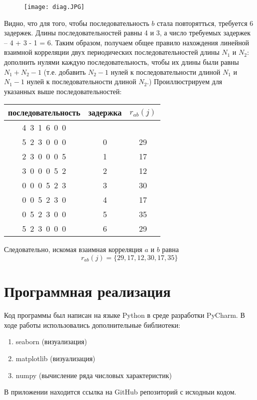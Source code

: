 \documentclass{article}
\begin{document}
\begin{figure}[H]
		\centering
		\texttt{[image: diag.JPG]}
		\label{fig:diag}
	\end{figure}
\noindent Видно, что для того, чтобы последовательность $b$ стала повторятться, требуется 6 задержек. Длины последовательностей равны 4 и 3, а число требуемых задержек -- 4 + 3 - 1 = 6. Таким образом, получаем общее правило нахождения линейной взаимной корреляции двух периодических последовательностей длины $N_1$ и $N_2$: дополнить нулями каждую последовательность, чтобы их длины были равны $N_1+N_2-1$ (т.е. добавить $N_2-1$ нулей к последовательности длиной $N_1$ и $N_1-1$ нулей к последовательности длиной $N_2$.) Проиллюстрируем для указанных выше последовательностей:

\begin{table}[H]
    \centering
    \begin{tabular}{|c|c|c|}
    \hline 
         последовательность & задержка & $r_{ab}(j)$  \\
         \hline \hline
         4~3~1~6~0~0 & & \\
         \hline
         5~2~3~0~0~0 & 0 & 29\\ \hline
         2~3~0~0~0~5 & 1 & 17\\ \hline
         3~0~0~0~5~2 & 2 & 12\\ \hline
         0~0~0~5~2~3 & 3 & 30\\ \hline
         0~0~5~2~3~0 & 4 & 17\\ \hline
         0~5~2~3~0~0 & 5 & 35\\ \hline
         5~2~3~0~0~0 & 6 & 29\\
     \hline    
    \end{tabular}
    \label{tab:my_label}
\end{table}
\noindent Следовательно, искомая взаимная корреляция $a$ и $b$ равна
$$r_{ab}(j)=\{29,17,12,30,17,35\}$$

\section{Программная реализация}
\noindent Код программы был написан на языке Python в среде разработки PyCharm. В ходе работы использовались дополнительные библиотеки:
 \begin{enumerate}
        \item seaborn (визуализация)
        \item matplotlib (визуализация)
        \item numpy (вычисление ряда числовых характеристик)
    \end{enumerate}
В приложении находится ссылка на GitHub репозиторий с исходныи кодом.
\end{document}
